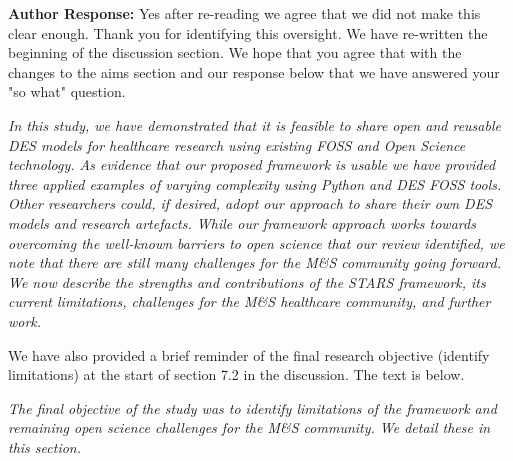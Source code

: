 \documentclass{article}
\begin{document}
\vspace{0.5cm}


\vspace{0.2cm}

\noindent\textbf{Author Response:} Yes after re-reading we agree that we did not make this clear enough. Thank you for identifying this oversight. We have re-written the beginning of the discussion section. We hope that you agree that with the changes to the aims section and our response below that we have answered your "so what" question.

\vspace{0.2cm}

\textit{{\color{red}In this study, we have demonstrated that it is feasible to share open and reusable DES models for healthcare research using existing FOSS and Open Science technology. As evidence that our proposed framework is usable we have provided three applied examples of varying complexity using Python and DES FOSS tools. Other researchers could, if desired, adopt our approach to share their own DES models and research artefacts. While our framework approach works towards overcoming the well-known barriers to open science that our review identified, we note that there are still many challenges for the M\&S community going forward. We now describe the strengths and contributions of the STARS framework, its current limitations, challenges for the M\&S healthcare community, and further work.
}}

\vspace{0.2cm}

We have also provided a brief reminder of the final research objective (identify limitations) at the start of section 7.2 in the discussion.  The text is below.

\vspace{0.2cm}

\textit{{\color{red}The final objective of the study was to identify limitations of the framework and remaining open science challenges for the M\&S community.  We detail these in this section.}}


\vspace{0.5cm}
\end{document}
